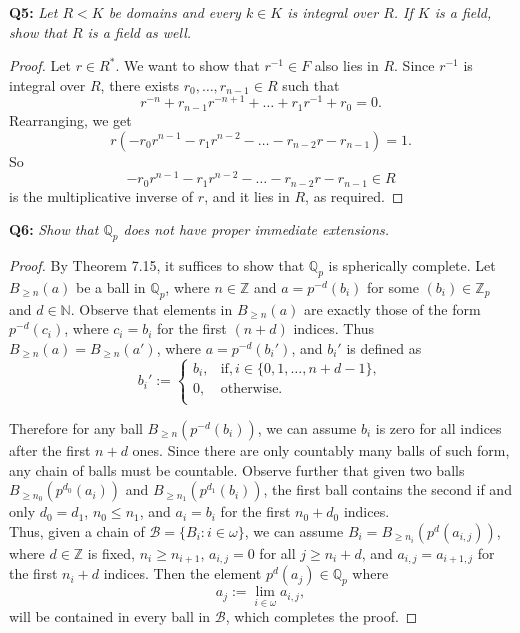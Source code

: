 \documentclass{article}
\begin{document}
\textbf{Q5:} \it Let $R<K$ be domains and every $k\in K$ is integral over
  $R$. If $K$ is a field, show that $R$ is a field as well.
  \begin{proof}
    Let $r\in R^*$. We want to show that $r^{-1}\in F$ also lies in $R$.
    Since $r^{-1}$ is integral over $R$, there exists
    $r_0,\ldots,r_{n-1}\in R$ such that
    \[r^{-n}+r_{n-1}r^{-n+1} +\ldots +r_1r^{-1}+r_0=0.\]
    Rearranging, we get
    \[r(-r_0r^{n-1} -r_1r^{n-2} -\ldots -r_{n-2}r -r_{n-1}) = 1.\]
    So
    \[-r_0r^{n-1} -r_1r^{n-2} -\ldots -r_{n-2}r -r_{n-1} \in R\]
    is the multiplicative inverse of $r$, and it lies in $R$, as required.
  \end{proof}

\textbf{Q6:} \it Show that $\mathbb{Q}_p$ does not have proper immediate
  extensions.
  \begin{proof}
    By Theorem 7.15, it suffices to show that $\mathbb{Q}_p$ is spherically
    complete. Let $B_{\geq n}(a)$ be a ball in $\mathbb{Q}_p$, where
    $n\in\mathbb{Z}$ and $a=p^{-d}(b_i)$ for some $(b_i)\in\mathbb{Z}_p$
    and $d\in\mathbb{N}$. Observe that elements in $B_{\geq n}(a)$ are
    exactly those of the form $p^{-d}(c_i)$, where $c_i=b_i$ for the first
    $(n+d)$ indices. Thus $B_{\geq n}(a)=B_{\geq n}(a')$, where
    $a=p^{-d}(b_i')$, and $b_i'$ is defined as
    \begin{equation*}
      b_i':=
      \begin{cases}
        b_i, &\text{if}, i\in\{0,1,\ldots,n+d-1\},\\
        0, &\text{otherwise}.\\
      \end{cases}
    \end{equation*}

    Therefore for any ball $B_{\geq n}(p^{-d}(b_i))$, we can assume $b_i$
    is zero for all indices after the first $n+d$ ones. Since there are
    only countably many balls of such form, any chain of balls must be
    countable. Observe further that given two balls $B_{\geq
    n_0}(p^{d_0}(a_i))$ and $B_{\geq n_1}(p^{d_1}(b_i))$, the first ball
    contains the second if and only $d_0=d_1$, $n_0\leq n_1$, and $a_i=b_i$
    for the first $n_0+d_0$ indices. \\

    Thus, given a chain of $\mathcal{B}=\{B_i:i\in\omega\}$, we can assume
    $B_i=B_{\geq n_i}(p^d(a_{i,j}))$, where $d\in\mathbb{Z}$ is fixed,
    $n_i\geq n_{i+1}$, $a_{i,j}=0$ for all $j\geq n_i+d$, and
    $a_{i,j}=a_{i+1,j}$ for the first $n_i+d$ indices. Then the element
    $p^d(a_j)\in\mathbb{Q}_p$ where
    \[a_j :=\lim_{i\in\omega} a_{i,j},\]
    will be contained in every ball in $\mathcal{B}$, which completes the
    proof.
  \end{proof}
\end{document}
